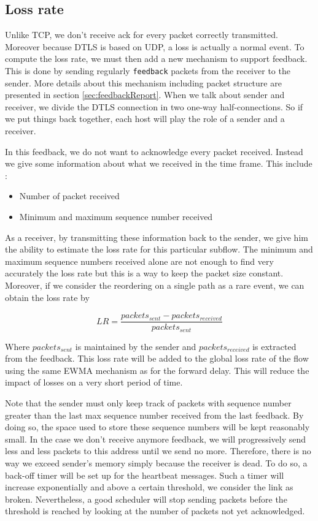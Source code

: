 \subsection{Loss rate}
\label{sec:design-loss-rate}

Unlike TCP, we don't receive ack for every packet correctly transmitted. Moreover because DTLS is based on UDP, a loss is actually a normal event. To compute the loss rate, we must then add a new mechanism to support feedback. This is done by sending regularly \texttt{feedback} packets from the receiver to the sender. More details about this mechanism including packet structure are presented in section \ref{sec:feedbackReport}. When we talk about sender and receiver, we divide the DTLS connection in two one-way half-connections. So if we put things back together, each host will play the role of a sender and a receiver.

In this feedback, we do not want to acknowledge every packet received. Instead we give some information about what we received in the time frame. This include : 

\begin{itemize}
\item Number of packet received
\item Minimum and maximum sequence number received
\end{itemize}

As a receiver, by transmitting these information back to the sender, we give him the ability to estimate the loss rate for this particular subflow. The minimum and maximum sequence numbers received alone are not enough to find very accurately the loss rate but this is a way to keep the packet size constant. Moreover, if we consider the reordering on a single path as a rare event, we can obtain the loss rate by 

\begin{equation*}
LR = \frac{packets_{sent} - packets_{received}}{packets_{sent}}
\end{equation*}

Where $packets_{sent}$ is maintained by the sender and $packets_{received}$ is extracted from the feedback. This loss rate will be added to the global loss rate of the flow using the same EWMA mechanism as for the forward delay. This will reduce the impact of losses on a very short period of time.

Note that the sender must only keep track of packets with sequence number greater than the last max sequence number received from the last feedback. By doing so, the space used to store these sequence numbers will be kept reasonably small. In the case we don't receive anymore feedback, we will progressively send less and less packets to this address until we send no more. Therefore, there is no way we exceed sender's memory simply because the receiver is dead. To do so, a back-off timer will be set up for the heartbeat messages. Such a timer will increase exponentially and above a certain threshold, we consider the link as broken. Nevertheless, a good scheduler will stop sending packets before the threshold is reached by looking at the number of packets not yet acknowledged. 

